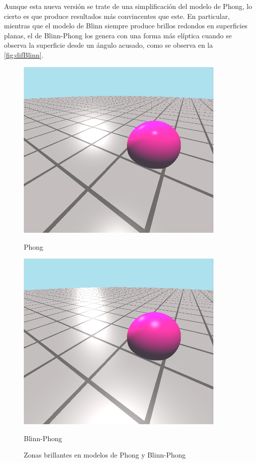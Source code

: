 Aunque esta nueva versión se trate de una simplificación del modelo de Phong, lo cierto es que produce resultados más convincentes que este. En particular, mientras que el modelo de Blinn siempre produce brillos redondos en superficies planas, el de Blinn-Phong los genera con una forma más elíptica cuando se observa la superficie desde un ángulo acusado, como se observa en la \autoref{fig:difBlinn}. 
\begin{figure}[!h]
     \begin{minipage}[c]{0.49\linewidth}
        \centering
        \includegraphics[width=0.9\textwidth]{Plantilla-TFG-master/img/compB.png}
        \caption{Phong}
     \end{minipage}
     \begin{minipage}[c]{0.49\linewidth}
        \centering
        \includegraphics[width=0.9\textwidth]{Plantilla-TFG-master/img/compBP.png}
        \caption{Blinn-Phong}
     \end{minipage}
     \caption{Zonas brillantes en modelos de Phong y Blinn-Phong}
     \label{fig:difBlinn}
\end{figure}


